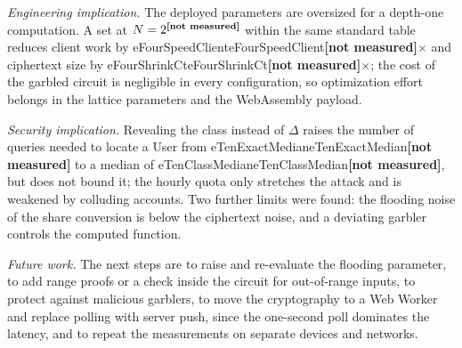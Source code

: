 \documentclass[conference,letterpaper]{IEEEtran}
\newcommand{\num}[1]{\ifcsname #1\endcsname\csname #1\endcsname\else\textbf{[not measured]}\fi}
\begin{document}
\emph{Engineering implication.} The deployed parameters are oversized for a depth-one computation. A set at $N = 2^{\num{eFourBestN}}$ within the same standard table reduces client work by \num{eFourSpeedClient}$\times$ and ciphertext size by \num{eFourShrinkCt}$\times$; the cost of the garbled circuit is negligible in every configuration, so optimization effort belongs in the lattice parameters and the WebAssembly payload.

\emph{Security implication.} Revealing the class instead of $\Delta$ raises the number of queries needed to locate a User from \num{eTenExactMedian} to a median of \num{eTenClassMedian}, but does not bound it; the hourly quota only stretches the attack and is weakened by colluding accounts. Two further limits were found: the flooding noise of the share conversion is below the ciphertext noise, and a deviating garbler controls the computed function.

\emph{Future work.} The next steps are to raise and re-evaluate the flooding parameter, to add range proofs or a check inside the circuit for out-of-range inputs, to protect against malicious garblers, to move the cryptography to a Web Worker and replace polling with server push, since the one-second poll dominates the latency, and to repeat the measurements on separate devices and networks.
\end{document}
